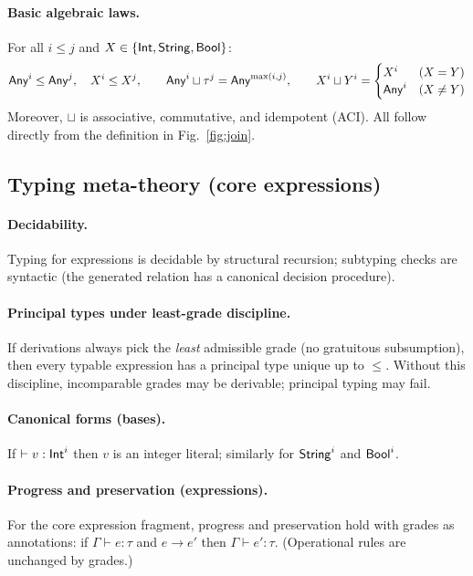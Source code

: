 \paragraph{Basic algebraic laws.}
For all $i\le j$ and $X\in\{\mathsf{Int},\mathsf{String},\mathsf{Bool}\}$:
\[
\mathsf{Any}^{i}\le \mathsf{Any}^{j},\quad X^{i}\le X^{j},\qquad
\mathsf{Any}^{i}\sqcup \tau^{j}= \mathsf{Any}^{\max(i,j)},\qquad
X^{i}\sqcup Y^{i}=
\begin{cases}
X^{i} & (X=Y)\\
\mathsf{Any}^{i} & (X\neq Y)
\end{cases}
\]
Moreover, $\sqcup$ is associative, commutative, and idempotent (ACI).
All follow directly from the definition in Fig.~\ref{fig:join}.

\subsection{Typing meta-theory (core expressions)}

\paragraph{Decidability.}
Typing for expressions is decidable by structural recursion; subtyping checks are syntactic (the generated relation has a canonical decision procedure).

\paragraph{Principal types under least-grade discipline.}
If derivations always pick the \emph{least} admissible grade (no gratuitous subsumption), then every typable expression has a principal type unique up to $\le$.
Without this discipline, incomparable grades may be derivable; principal typing may fail.

\paragraph{Canonical forms (bases).}
If $\vdash v:\mathsf{Int}^{i}$ then $v$ is an integer literal; similarly for $\mathsf{String}^{i}$ and $\mathsf{Bool}^{i}$.

\paragraph{Progress and preservation (expressions).}
For the core expression fragment, progress and preservation hold with grades as annotations: if $\Gamma\vdash e:\tau$ and $e\to e'$ then $\Gamma\vdash e':\tau$.
(Operational rules are unchanged by grades.)

